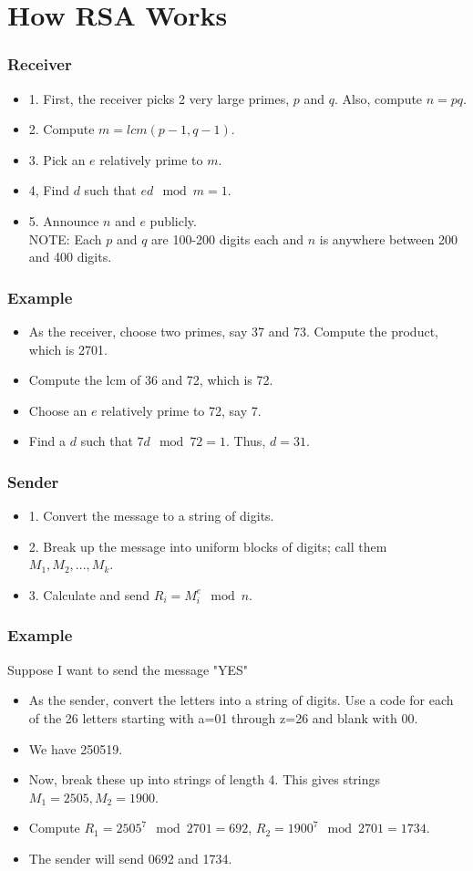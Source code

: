 \documentclass{beamer}
\begin{document}
\section{How RSA Works}
\begin{frame}
\frametitle{Receiver}
\begin{itemize}
\item 1. First, the receiver picks 2 very large primes, $p$ and $q$. Also, compute $n=pq$.
\item 2. Compute $m=lcm (p-1, q-1)$. 
\item 3. Pick an $e$ relatively prime to $m$. 
\item 4, Find $d$ such that $ed \mod m=1$.
\item 5. Announce $n$ and $e$ publicly. \\
NOTE: Each $p$ and $q$ are 100-200 digits each and $n$ is anywhere between 200 and 400 digits.
\end{itemize}
\end{frame}
\begin{frame}
\frametitle{Example}
\begin{itemize}
\item As the receiver, choose two primes, say 37 and 73. Compute the product, which is 2701.
\item Compute the lcm of 36 and 72, which is 72. 
\item Choose an $e$ relatively prime to 72, say 7. 
\item Find a $d$ such that $7d \mod 72=1$. Thus, $d=31$.
\end{itemize}
\end{frame}

\begin{frame}
\frametitle{Sender}
\begin{itemize}
\item 1. Convert the message to a string of digits.
\item 2. Break up the message into uniform blocks of digits; call them $M_1, M_2, ... , M_k$.
\item 3. Calculate and send $R_i=M_i^e \mod n$.
\end{itemize}
\end{frame}
\begin{frame}
\frametitle{Example}
Suppose I want to send the message "YES"
\begin{itemize}

\item As the sender, convert the letters into a string of digits. Use a code for each of the 26 letters starting with a=01 through z=26 and blank with 00.
\item We have 250519.
\item Now, break these up into strings of length 4. This gives strings $M_1= 2505, M_2=1900$.
\item Compute $R_1=2505^7 \mod 2701=692$, $R_2=1900^7 \mod 2701=1734$.
\item The sender will send 0692 and 1734.
\end{itemize}
\end{frame}
\end{document}
